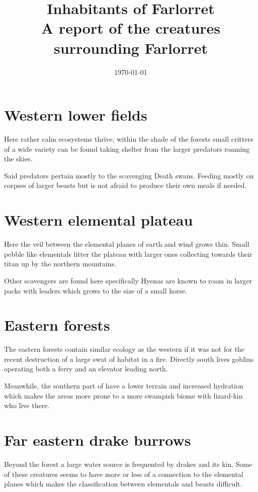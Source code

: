 \documentclass{article}
\title{Inhabitants of Farlorret\\
\large A report of the creatures surrounding Farlorret}
\date{\today}
\begin{document}
    \maketitle

    \section*{Western lower fields}

    Here rather calm ecosystems thrive, within the shade of the forests small critters of a wide variety can be found taking shelter from the larger predators roaming the skies. 

    Said predators pertain mostly to the scavenging Death swans. Feeding mostly on corpses of larger beasts but is not afraid to produce their own meals if needed. 

    \section*{Western elemental plateau}

    Here the veil between the elemental planes of earth and wind grows thin. Small pebble like elementals litter the plateau with larger ones collecting towards their titan up by the northern mountains.

    Other scavengers are found here specifically Hyenas are known to roam in larger packs with leaders which grows to the size of a small horse.

    \section*{Eastern forests}

    The eastern forests contain similar ecology as the western if it was not for the recent destruction of a large swat of habitat in a fire. Directly south lives goblins operating both a ferry and an elevator leading north.
    
    Meanwhile, the southern part of have a lower terrain and increased hydration which makes the areas more prone to a more swampish biome with lizard-kin who live there.


    \section*{Far eastern drake burrows}

    Beyond the forest a large water source is frequented by drakes and its kin. Some of these creatures seems to have more or less of a connection to the elemental planes which makes the classification between elementals and beasts difficult.
\end{document}
